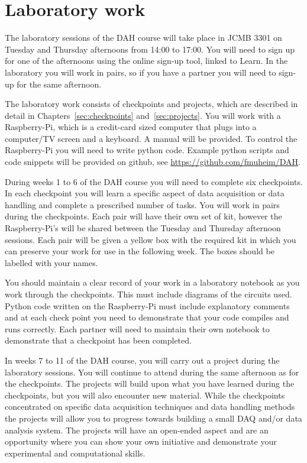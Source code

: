 \section{Laboratory work}

The laboratory sessions of the DAH course will take place in JCMB 3301 on Tuesday and Thursday afternoons from 14:00 to 17:00.  You will need to sign up for one of the afternoons using the online sign-up tool, linked to Learn. In the laboratory you will work in pairs, so if you have a partner you will need to sign-up for the same afternoon.

The laboratory work consists of checkpoints and projects, which are described in detail in Chapters~\ref{sec:checkpoints} and~\ref{sec:projects}.  You will work with a Raspberry-Pi, which is a credit-card sized computer that plugs into a computer/TV screen and a keyboard. A manual will be provided. To control the Raspberry-Pi you will need to write python code. Example python scripts and code snippets will be provided on github, see \url{https://github.com/fmuheim/DAH}. 

During weeks 1 to 6 of the DAH course you will need to complete six checkpoints. In each checkpoint you will learn a specific aspect of data acquisition or data handling and complete a prescribed number of tasks. You will work in pairs during the checkpoints.
Each pair will have their own set of kit, however the Raspberry-Pi's will be shared between the Tuesday and Thursday afternoon sessions. Each pair will be given a yellow box with the required kit in which you can preserve your work for use in the following week. The boxes should be labelled with your names.

You should maintain a clear record of your work in a laboratory notebook as you work through the checkpoints. This must include diagrams of the circuits used. Python code written on the Raspberry-Pi must include explanatory comments and at each check point you need to demonstrate that your code compiles and runs correctly.  Each partner will need to maintain their own notebook to demonstrate that a checkpoint has been completed. 



In weeks 7 to 11 of the DAH course, you will carry out a project during the laboratory sessions. You will continue to attend during the same afternoon as for the checkpoints.
The projects will build upon what you have learned during the checkpoints, but you will also encounter new material. While the checkpoints concentrated on specific data acquisition techniques and data handling methods the projects will allow you to progress towards building a small DAQ and/or data analysis system. The projects will have an open-ended aspect and are an opportunity where you can show your own initiative and demonstrate your experimental and computational skills. 

